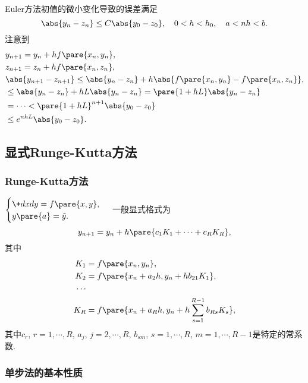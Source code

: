 \documentclass[hidelinks]{ctexart}
\begin{document}
Euler方法初值的微小变化导致的误差满足
\[ \abs{y_n - z_n} \le C\abs{y_0 - z_0},\quad 0<h<h_0,\quad a<nh<b. \]
注意到
\begin{align*}
    & y_{n+1} = y_n + hf\pare{x_n,y_n}, \\
    & z_{n+1} = z_n + hf\pare{x_n,z_n}, \\
    &\abs{y_{n+1} - z_{n+1}} \le \abs{y_n - z_n} + h\abs{f\pare{x_n,y_n} - f\pare{x_n,z_n}},\\
    & \le \abs{y_n - z_n} + hL\abs{y_n - z_n} = \pare{1+hL}\abs{y_n - z_n} \\
    & = \cdots < \pare{1+hL}^{n+1}\abs{y_0 - z_0} \\
    & \le e^{nhL}\abs{y_0 - z_0}.
\end{align*}



\subsection{显式Runge-Kutta方法} %
\label{sub:显式runge_kutta方法}

\subsubsection{Runge-Kutta方法} %
\label{ssub:runge_kutta方法}

$\displaystyle \begin{cases}
    \displaystyle \+dxdy = f\pare{x,y}, \\
    y\pare{a} = \tilde{y}.
\end{cases}$
一般显式格式为
\[ y_{n+1} = y_n + h\pare{c_1 K_1 + \cdots + c_RK_R}, \]
其中
\begin{align*}
    K_1 &= f\pare{x_n,y_n}, \\
    K_2 &= f\pare{x_n + a_2h, y_n + hb_{21}K_1}, \\
    \cdots & \\
    K_R &= f\pare{x_n + a_Rh,y_n + h\sum_{s=1}^{R-1}b_{Rs}K_s},
\end{align*}
其中$c_r$, $r=1,\cdots,R$, $a_j$, $j=2,\cdots,R$, $b_{sm}$, $s=1,\cdots,R$, $m=1,\cdots,R-1$是特定的常系数.


\subsubsection{单步法的基本性质} %
\label{ssub:单步法的基本性质}
\end{document}
